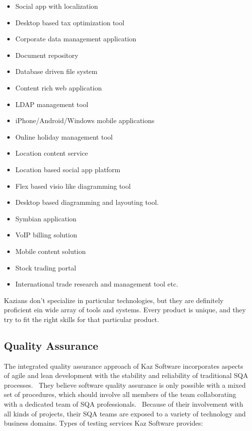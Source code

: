 \begin{itemize}
    \item Social app with localization
    \item Desktop based tax optimization tool
    \item Corporate data management application
    \item Document repository
    \item Database driven file system
    \item Content rich web application
    \item LDAP management tool
    \item iPhone/Android/Windows mobile applications
    \item Online holiday management tool
    \item Location content service
    \item Location based social app platform
    \item Flex based visio like diagramming tool
    \item Desktop based diagramming and layouting tool.
    \item Symbian application
    \item VoIP billing solution
    \item Mobile content solution
    \item Stock trading portal
    \item International trade research and management tool etc.
\end{itemize}

Kazians don't specialize in particular technologies, but they are definitely proficient ein wide array of tools and systems.
Every product is unique, and they try to fit the right skills for that particular product.

\subsection{Quality Assurance}

The integrated quality assurance approach of Kaz Software incorporates aspects of agile and lean development with the stability and reliability of traditional SQA processes. 
They believe software quality assurance is only possible with a mixed set of procedures, which should involve all members of the team collaborating with a dedicated team of SQA professionals. 
Because of their involvement with all kinds of projects, their SQA teams are exposed to a variety of technology and business domains.
Types of testing services Kaz Software provides:

